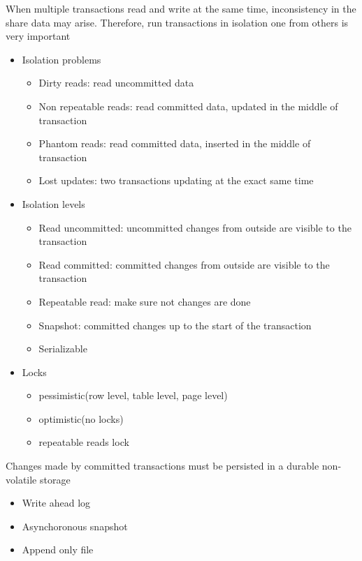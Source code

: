 \documentclass[../../main.tex]{subfiles}
\begin{document}
\begin{definition}[Isolation]
    When multiple transactions read and write at the same time, inconsistency in the share data may arise. Therefore, run transactions in isolation one from others is very important
    \begin{itemize}
        \item Isolation problems
        \begin{itemize}
            \item Dirty reads: read uncommitted data
            \item Non repeatable reads: read committed data, updated in the middle of transaction
            \item Phantom reads: read committed data, inserted in the middle of transaction
            \item Lost updates: two transactions updating at the exact same time
        \end{itemize}
        \item Isolation levels
        \begin{itemize}
            \item Read uncommitted: uncommitted changes from outside are visible to the transaction
            \item Read committed: committed changes from outside are visible to the transaction
            \item Repeatable read: make sure not changes are done
            \item Snapshot: committed changes up to the start of the transaction
            \item Serializable
        \end{itemize}
        \item Locks
        \begin{itemize}
            \item pessimistic(row level, table level, page level)
            \item optimistic(no locks)
            \item repeatable reads lock
        \end{itemize}
    \end{itemize}
\end{definition}


\begin{definition}[Durability]
    Changes made by committed transactions must be persisted in a durable non-volatile storage
    \begin{itemize}
        \item Write ahead log
        \item Asynchoronous snapshot
        \item Append only file
    \end{itemize}
\end{definition}
\end{document}
